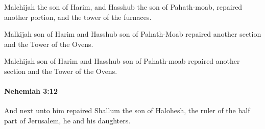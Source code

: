 			\begin{versebox}
					\item[BHS] 
					\item[LXX] 
					\item[ASV] Malchijah the son of Harim, and Hasshub the son of Pahath-moab, repaired another portion, and the tower of the furnaces.
					\item[NIV] Malkijah son of Harim and Hasshub son of Pahath-Moab repaired another section and the Tower of the Ovens.
					\item[NRSV] Malchijah son of Harim and Hasshub son of Pahath-moab repaired another section and the Tower of the Ovens.
			\end{versebox}

		\paragraph{Nehemiah 3:12} %
			\label{NEHEMIAH-3-12}

			And next unto him repaired Shallum the son of Halohesh, the ruler of the half part of Jerusalem, he and his daughters.

